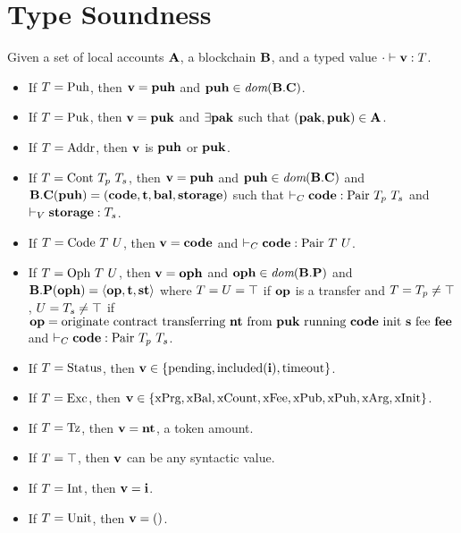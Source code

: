 \clearpage
\appendix

\section{Type Soundness}
\label{sec:type-soundness}

\begin{lemma}\label{lemma:canonical-forms}
  Given a set of local accounts $\textbf{A}$, a blockchain
  $\textbf{B}$, and a typed value $\cdot \vdash \textbf{v} : T$.
  \begin{itemize}
  \item If $T=\text{Puh}$, then $\textbf{v}=\textbf{puh}$ and $\textbf{puh} \in \textit{dom}
    (\textbf{B}.\textbf{C})$.
  \item If $T = \text{Puk}$, then $\textbf{v}=\textbf{puk}$ and $\exists\textbf{pak}$ such
    that $(\textbf{pak}, \textbf{puk}) \in \textbf{A}$.
  \item If $T = \text{Addr}$, then $\textbf{v}$ is $\textbf{puh}$ or $\textbf{puk}$.
  \item If $\TYPE = \TCONTRACT\ \TYPE_p\ \TYPE_s$, then $\textbf{v}=\textbf{puh}$
    and $\textbf{puh} \in \textit{dom} (\textbf{B}.\textbf{C})$ and
    $\textbf{B}.\textbf{C} (\textbf{puh}) = (\textbf{code}, \textbf{t}, \textbf{bal}, \textbf{storage})$
    such that $      \vdash_C\textbf{code} :  \text{Pair}\ T_p\ T_s$ and
    $\vdash_V\textbf{storage}: T_s$.
  \item If $\TYPE = \TCODE\ \TYPE\ \TYPEU$, then $\textbf{v} = \textbf{code}$ and
    $\JTypeCode \CODE{\TPAIR\ \TYPE\ \TYPEU}$.
  \item If $\TYPE = \TOPH\ \TYPE\ \TYPEU$, then $\textbf{v} = \textbf{oph}$ and
    $\textbf{oph}\in \textit{dom} (\textbf{B}.\textbf{P})$ and $\textbf{B}.\textbf{P}
    (\textbf{oph}) = \langle\textbf{op}, \textbf{t}, \textbf{st}\rangle$ where $T=U=\top$ if
    $\textbf{op}$ is a transfer and $T=T_p\ne\top$, $U=T_s\ne\top$ if $\textbf{op}
    = \text{originate contract transferring $\textbf{nt}$ from $\textbf{puk}$ running $\textbf{code}$ init $\textbf{s}$ fee $\textbf{fee}$}$ and $\vdash_C\textbf{code} : 
      \text{Pair}\ T_p\ T_s$.
  \item If $T = \text{Status}$, then $\textbf{v} \in \{\text{pending} , \text{included} (\textbf{i}),
    \text{timeout}\}$.
  \item If $T = \text{Exc}$, then $\textbf{v} \in \{\text{xPrg}, \text{xBal}, \text{xCount}, \text{xFee},
    \text{xPub}, \text{xPuh}, \text{xArg}, \text{xInit} \}$.
  \item If $T = \text{Tz}$, then $\textbf{v} = \textbf{nt}$, a token amount.
  \item If $T = \top$, then $\textbf{v}$ can be any syntactic value.
  \item If $T = \text{Int}$, then $\textbf{v} = \textbf{i}$.
  \item If $T = \text{Unit}$, then $\textbf{v} = \text{()}$.

\end{itemize}
\end{lemma}
